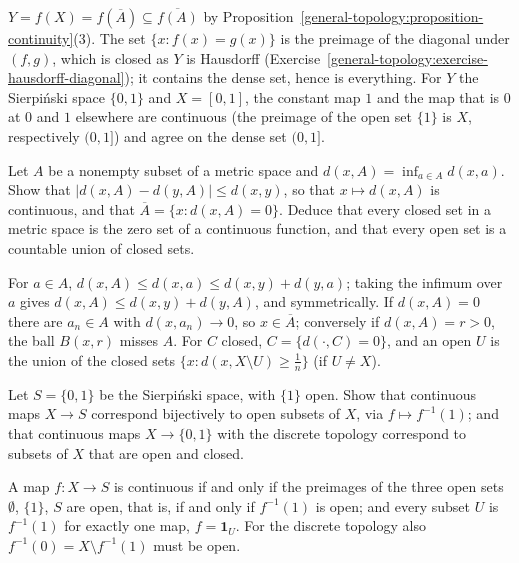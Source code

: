 \begin{solution}
$Y = f(X) = f(\overline{A}) \subseteq \overline{f(A)}$ by Proposition~\ref{general-topology:proposition-continuity}(3). The set $\{x : f(x) = g(x)\}$ is the preimage of the diagonal under $(f, g)$, which is
closed as $Y$ is Hausdorff (Exercise~\ref{general-topology:exercise-hausdorff-diagonal}); it contains the dense set, hence is everything. For $Y$ the Sierpi\'nski space $\{0, 1\}$ and $X = [0, 1]$, the
constant map $1$ and the map that is $0$ at $0$ and $1$ elsewhere are continuous (the preimage of the open set $\{1\}$ is $X$, respectively $(0, 1]$) and agree on the dense set $(0, 1]$.
\end{solution}

\begin{exercise}\label{general-topology:exercise-distance-set}
Let $A$ be a nonempty subset of a metric space and $d(x, A) = \inf_{a \in A}d(x, a)$. Show that $|d(x, A) - d(y, A)| \leq d(x, y)$, so that $x \mapsto d(x, A)$ is continuous, and that
$\overline{A} = \{x : d(x, A) = 0\}$. Deduce that every closed set in a metric space is the zero set of a continuous function, and that every open set is a countable union of closed sets.
\end{exercise}

\begin{solution}
For $a \in A$, $d(x, A) \leq d(x, a) \leq d(x, y) + d(y, a)$; taking the infimum over $a$ gives $d(x, A) \leq d(x, y) + d(y, A)$, and symmetrically. If $d(x, A) = 0$ there are $a_n \in A$ with
$d(x, a_n) \to 0$, so $x \in \overline{A}$; conversely if $d(x, A) = r > 0$, the ball $B(x, r)$ misses $A$. For $C$ closed, $C = \{d(\cdot, C) = 0\}$, and an open $U$ is the union of the closed sets
$\{x : d(x, X \setminus U) \geq \frac1n\}$ (if $U \neq X$).
\end{solution}

\begin{exercise}\label{general-topology:exercise-two-point-continuous}
Let $S = \{0, 1\}$ be the Sierpi\'nski space, with $\{1\}$ open. Show that continuous maps $X \to S$ correspond bijectively to open subsets of $X$, via $f \mapsto f^{-1}(1)$; and that continuous maps
$X \to \{0, 1\}$ with the discrete topology correspond to subsets of $X$ that are open and closed.
\end{exercise}

\begin{solution}
A map $f \colon X \to S$ is continuous if and only if the preimages of the three open sets $\emptyset$, $\{1\}$, $S$ are open, that is, if and only if $f^{-1}(1)$ is open; and every subset $U$ is
$f^{-1}(1)$ for exactly one map, $f = \mathbf{1}_U$. For the discrete topology also $f^{-1}(0) = X \setminus f^{-1}(1)$ must be open.
\end{solution}

